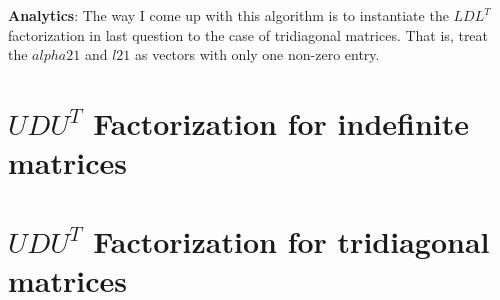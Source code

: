 \documentclass[11pt,a4paper]{article}
\begin{document}
\noindent
\textbf{Analytics}: 
    The way I come up with this algorithm is to instantiate the $LDL^T$
    factorization in last question to the case of tridiagonal matrices. That
    is, treat the $alpha21$ and $l21$ as vectors with only one non-zero entry.

\newpage
\section{$UDU^T$ Factorization for indefinite matrices}


\newpage
\section{$UDU^T$ Factorization for tridiagonal matrices}


\newpage
\end{document}
